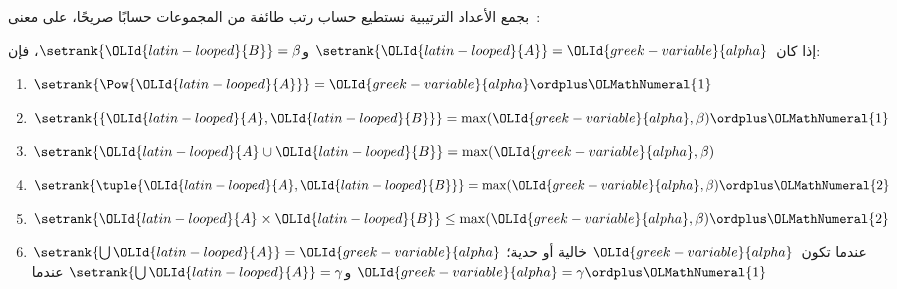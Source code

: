\documentclass[../../../include/open-logic-section]{subfiles}
\begin{document}

بجمع الأعداد الترتيبية نستطيع حساب رتب طائفة من المجموعات حسابًا
صريحًا، على معنى~:

\begin{lem}
إذا كان~$\setrank{\OLId{latin-looped}{A}} = \OLId{greek-variable}{alpha}$ و$\setrank{\OLId{latin-looped}{B}} = \beta$، فإن:
\begin{enumerate}
	\item{} $\setrank{\Pow{\OLId{latin-looped}{A}}} = \OLId{greek-variable}{alpha}\ordplus \OLMathNumeral{1}$
	\item{} $\setrank{\{\OLId{latin-looped}{A}, \OLId{latin-looped}{B}\}} = \max(\OLId{greek-variable}{alpha},
	\beta) \ordplus \OLMathNumeral{1}$
	\item{} $\setrank{\OLId{latin-looped}{A} \cup \OLId{latin-looped}{B}} = \max(\OLId{greek-variable}{alpha},
	\beta)$
	\item{} $\setrank{\tuple{\OLId{latin-looped}{A},\OLId{latin-looped}{B}}} = \max(\OLId{greek-variable}{alpha},
	\beta) \ordplus \OLMathNumeral{2}$
	\item{} $\setrank{\OLId{latin-looped}{A} \times \OLId{latin-looped}{B}} \leq \max(\OLId{greek-variable}{alpha},
	\beta) \ordplus \OLMathNumeral{2}$
	\item{} $\setrank{\bigcup \OLId{latin-looped}{A}} = \OLId{greek-variable}{alpha}$ عندما
	تكون~$\OLId{greek-variable}{alpha}$ خالية أو حدية؛ و$\setrank{\bigcup \OLId{latin-looped}{A}} = \gamma$ عندما
	$\OLId{greek-variable}{alpha} = \gamma\ordplus \OLMathNumeral{1}$
\end{enumerate}
\end{lem}
\end{document}

